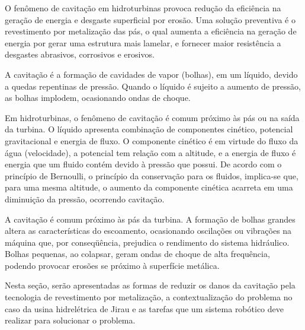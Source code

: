 O fenômeno de cavitação em hidroturbinas provoca redução da eficiência na
geração de energia e desgaste superficial por erosão. Uma solução preventiva é
o revestimento por metalização das pás, o qual aumenta a eficiência na
geração de energia por gerar uma estrutura mais lamelar, e fornecer maior
resistência a desgastes abrasivos, corrosivos e erosivos.

A cavitação é a formação de cavidades de vapor (bolhas), em um líquido, devido a
quedas repentinas de pressão. Quando o líquido é sujeito a aumento de pressão,
as bolhas implodem, ocasionando ondas de choque.

Em hidroturbinas, o fenômeno de cavitação é comum próximo às pás ou
na saída da turbina. O líquido apresenta combinação
de componentes cinético, potencial gravitacional e energia de fluxo. O
componente cinético é em virtude do fluxo da água (velocidade), a potencial tem
relação com a altitude, e a energia de fluxo é energia que um fluido contém
devido à pressão que possui. De acordo com o princípio de Bernoulli, o princípio
da conservação para os fluidos, implica-se que, para uma mesma altitude, o
aumento da componente cinética acarreta em uma diminuição da pressão, ocorrendo
cavitação. 

A cavitação é comum próximo às pás da turbina. A formação de bolhas grandes
altera as características do escoamento, ocasionando oscilações ou vibrações na
máquina que, por conseqüência, prejudica o rendimento do sistema hidráulico.
Bolhas pequenas, ao colapsar, geram ondas de choque de alta frequência, podendo
provocar erosões se próximo à superfície metálica.

Nesta seção, serão apresentadas as formas de reduzir os danos da cavitação pela
tecnologia de revestimento por metalização, a contextualização do problema no
caso da usina hidrelétrica de Jirau e as tarefas que um sistema robótico deve
realizar para solucionar o problema.

